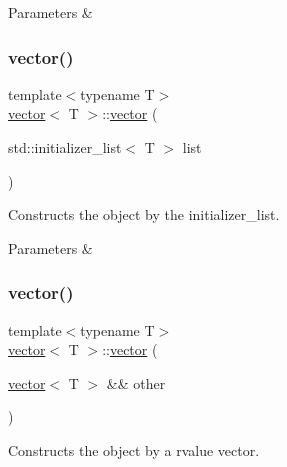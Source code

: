 \begin{DoxyParams}{Parameters}
{\em } & \\
\hline
\end{DoxyParams}
\mbox{\label{classvector_a0e4c03e366983edcfeab3fff1968174c}} 
\subsubsection{\texorpdfstring{vector()}{vector()}\hspace{0.1cm}{\footnotesize\ttfamily [4/6]}}
{\footnotesize\ttfamily template$<$typename T$>$ \\
\hyperlink{classvector}{vector}$<$ T $>$\+::\hyperlink{classvector}{vector} (\begin{DoxyParamCaption}\item[{std\+::initializer\+\_\+list$<$ T $>$}]{list }\end{DoxyParamCaption})\hspace{0.3cm}{\ttfamily [inline]}}



Constructs the object by the initializer\+\_\+list. 


\begin{DoxyParams}{Parameters}
{\em } & \\
\hline
\end{DoxyParams}
\mbox{\label{classvector_a574f3d317cdd3589fdd519c50a1cd3f8}} 
\subsubsection{\texorpdfstring{vector()}{vector()}\hspace{0.1cm}{\footnotesize\ttfamily [5/6]}}
{\footnotesize\ttfamily template$<$typename T$>$ \\
\hyperlink{classvector}{vector}$<$ T $>$\+::\hyperlink{classvector}{vector} (\begin{DoxyParamCaption}\item[{\hyperlink{classvector}{vector}$<$ T $>$ \&\&}]{other }\end{DoxyParamCaption})\hspace{0.3cm}{\ttfamily [inline]}}



Constructs the object by a rvalue vector. 


